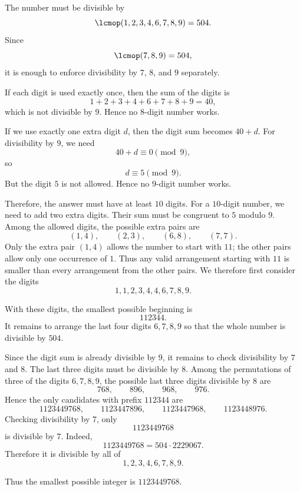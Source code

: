     \begin{solution}
        The number must be divisible by
        \[
            \lcmop(1,2,3,4,6,7,8,9)=504.
        \]
        Since
        \[
            \lcmop(7,8,9)=504,
        \]
        it is enough to enforce divisibility by $7$, $8$, and $9$ separately.

        If each digit is used exactly once, then the sum of the digits is
        \[
            1+2+3+4+6+7+8+9=40,
        \]
        which is not divisible by $9$. Hence no $8$-digit number works.

        If we use exactly one extra digit $d$, then the digit sum becomes $40+d$. For divisibility
        by $9$, we need
        \[
            40+d\equiv 0\pmod{9},
        \]
        so
        \[
            d\equiv 5\pmod{9}.
        \]
        But the digit $5$ is not allowed. Hence no $9$-digit number works.

        Therefore, the answer must have at least $10$ digits. For a $10$-digit number, we need to
        add two extra digits. Their sum must be congruent to $5$ modulo $9$. Among the allowed
        digits, the possible extra pairs are
        \[
            (1,4),\qquad (2,3),\qquad (6,8),\qquad (7,7).
        \]
        Only the extra pair $(1,4)$ allows the number to start with $11$; the other pairs allow only one occurrence of $1$. Thus any valid arrangement starting with $11$ is smaller than every arrangement from the other pairs. We therefore first consider the digits
        \[
            1,1,2,3,4,4,6,7,8,9.
        \]

        With these digits, the smallest possible beginning is
        \[
            112344.
        \]
        It remains to arrange the last four digits $6,7,8,9$ so that the whole number is divisible
        by $504$.

        Since the digit sum is already divisible by $9$, it remains to check divisibility by $7$ and
        $8$. The last three digits must be divisible by $8$. Among the permutations of three of the
        digits $6,7,8,9$, the possible last three digits divisible by $8$ are
        \[
            768,\qquad 896,\qquad 968,\qquad 976.
        \]
        Hence the only candidates with prefix $112344$ are
        \[
            1123449768,\qquad
            1123447896,\qquad
            1123447968,\qquad
            1123448976.
        \]
        Checking divisibility by $7$, only
        \[
            1123449768
        \]
        is divisible by $7$. Indeed,
        \[
            1123449768=504\cdot 2229067.
        \]
        Therefore it is divisible by all of
        \[
            1,2,3,4,6,7,8,9.
        \]

        Thus the smallest possible integer is $\boxed{1123449768}$.
    \end{solution}

